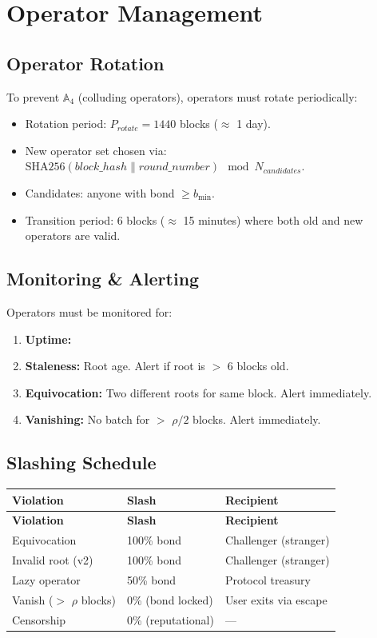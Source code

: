 \documentclass[a4paper,11pt]{article}
\begin{document}
\section{Operator Management}

\subsection{Operator Rotation}

To prevent $\mathbb{A}_4$ (colluding operators), operators must rotate periodically:

\begin{itemize}[nosep]
    \item Rotation period: $P_{rotate} = 1440$ blocks ($\approx$ 1 day).
    \item New operator set chosen via: $\text{SHA256}(block\_hash \| round\_number) \mod N_{candidates}$.
    \item Candidates: anyone with bond $\geq b_{\min}$.
    \item Transition period: 6 blocks ($\approx$ 15 minutes) where both old and new operators are valid.
\end{itemize}

\subsection{Monitoring \& Alerting}

Operators must be monitored for:
\begin{enumerate}[nosep]
    \item \textbf{Uptime:} %
    \item \textbf{Staleness:} Root age. Alert if root is $>$ 6 blocks old.
    \item \textbf{Equivocation:} Two different roots for same block. Alert immediately.
    \item \textbf{Vanishing:} No batch for $>$ $\rho/2$ blocks. Alert immediately.
\end{enumerate}

\subsection{Slashing Schedule}

\begin{longtable}{lll}
\toprule
\textbf{Violation} & \textbf{Slash} & \textbf{Recipient} \\
\midrule
\endfirsthead
\toprule
\textbf{Violation} & \textbf{Slash} & \textbf{Recipient} \\
\midrule
\endhead
Equivocation & 100\% bond & Challenger (stranger) \\
Invalid root (v2) & 100\% bond & Challenger (stranger) \\
Lazy operator & 50\% bond & Protocol treasury \\
Vanish ($>$ $\rho$ blocks) & 0\% (bond locked) & User exits via escape \\
Censorship & 0\% (reputational) & --- \\
\bottomrule
\end{longtable}
\end{document}
